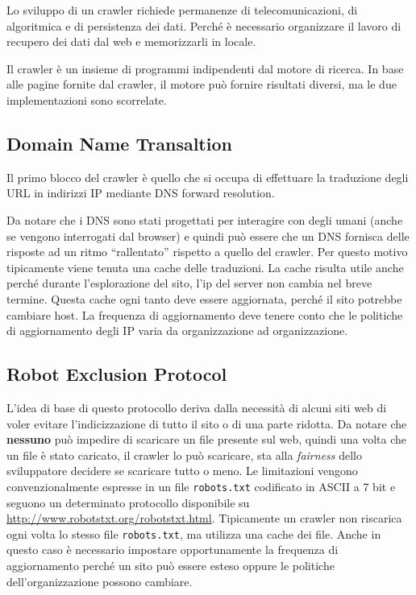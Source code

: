 

Lo sviluppo di un crawler richiede permanenze di telecomunicazioni, di algoritmica e di persistenza dei dati. Perché è necessario organizzare il lavoro di recupero dei dati dal web e memorizzarli in locale.

Il crawler è un insieme di programmi indipendenti dal motore di ricerca. In base alle pagine fornite dal crawler, il motore può fornire risultati diversi, ma le due implementazioni sono scorrelate.

\subsection{Domain Name Transaltion}

Il primo blocco del crawler è quello che si occupa di effettuare la traduzione degli URL in indirizzi IP mediante DNS forward resolution.

Da notare che i DNS sono stati progettati per interagire con degli umani (anche se vengono interrogati dal browser) e quindi può essere che un DNS fornisca delle risposte ad un ritmo ``rallentato'' rispetto a quello del crawler. Per questo motivo tipicamente viene tenuta una cache delle traduzioni.
La cache risulta utile anche perché durante l'esplorazione del sito, l'ip del server non cambia nel breve termine. 
Questa cache ogni tanto deve essere aggiornata, perché il sito potrebbe cambiare host. La frequenza di aggiornamento deve tenere conto che le politiche di aggiornamento degli IP varia da organizzazione ad organizzazione.

\subsection{Robot Exclusion Protocol}

L'idea di base di questo protocollo deriva dalla necessità di alcuni siti web di voler evitare l'indicizzazione di tutto il sito o di una parte ridotta.
Da notare che \textbf{nessuno} può impedire di scaricare un file presente sul web, quindi una volta che un file è stato caricato, il crawler lo può scaricare, sta alla \textit{fairness} dello sviluppatore decidere se scaricare tutto o meno.
Le limitazioni vengono convenzionalmente espresse in un file \texttt{robots.txt} codificato in ASCII a 7 bit e seguono un determinato protocollo disponibile su \url{http://www.robotstxt.org/robotstxt.html}.
Tipicamente un crawler non riscarica ogni volta lo stesso file \texttt{robots.txt}, ma utilizza una cache dei file.
Anche in questo caso è necessario impostare opportunamente la frequenza di aggiornamento perché un sito può essere esteso oppure le politiche dell'organizzazione possono cambiare.

